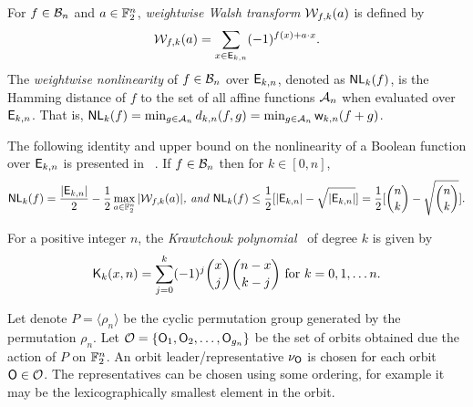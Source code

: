 \documentclass{llncs}
\begin{document}
For $f \in \mathcal{B}_n$ and $a \in \F_2^n$, {\em weightwise Walsh transform} $\mathcal{W}_{f,k}(a)$ is defined by 
\[\mathcal{W}_{f,k}(a) = \sum_{x \in \mathsf{E}_{k,n}} (-1)^{f(x)+ a \cdot x}.\]
The {\em weightwise nonlinearity} of $f \in \mathcal{B}_n$ over $\mathsf{E}_{k,n}$, denoted as $\mathsf{NL}_{k}(f)$, is the Hamming distance of $f$ to the set of all affine functions $\mathcal{A}_n$ when evaluated over $\mathsf{E}_{k,n}$. 
That is, $\mathsf{NL}_{k}(f) = \min_{g \in \mathcal{A}_n} d_{k,n}(f,g) = \min_{g \in \mathcal{A}_n} \mathsf{w}_{k,n}(f+g)$.

The following identity and upper bound on the nonlinearity of a Boolean function over $\mathsf{E}_{k,n}$ is presented in ~\cite{TOSC:CarMeaRot17}.
If $f \in \mathcal{B}_n$ then for $k \in [0,n]$, 
\[\mathsf{NL}_{k}(f) = \frac{|\mathsf{E}_{k,n}|}{2}- \frac{1}{2}\max_{a \in \mathbb{F}_2^n} |\mathcal{W}_{f,k}(a)| \textit{, and }
 \mathsf{NL}_{k}(f) \leq \frac{1}{2} [|\mathsf{E}_{k,n}| - \sqrt{|\mathsf{E}_{k,n}|}] = \frac{1}{2} [{n \choose k} - \sqrt{{n \choose k}}].\]

For a positive integer $n$, the {\em Krawtchouk polynomial}~\cite[Page $151$]{book:MacSlo78} of degree $k$ is given by 
\[\mathsf{K}_{k}(x,n)= \sum_{j=0}^{k} (-1)^j {x \choose j} {n-x \choose k-j} \text{ for } k = 0, 1, \ldots n.\]
\iffalse
Following the results in~\cite{DCC:DalMaiSar06,DAM:GinMea22}, the following relations can be derived.
\begin{theorem}[Krawtchouk Polynomials relations] \label{thm:Kraw}
For integers $n > 0$, $0 \leq k \leq n$ and fixed $a \in \F_2^n$ such that $\w(a) = \ell$, the following relations hold.
\begin{enumerate}
\item $\sum\limits_{x \in \Ekn{k}{n}} (-1)^{a.x} = \kraw{k}{\ell}{n}$.
\item If $l_{a,b}(x)= a \cdot x + b$, where $a \in \F_2^n, b \in \F_2$, be an affine Boolean function then 
\[\wkn{n}{k}(l_{a,b}) = \frac{1}{2} (|\Ekn{k}{n}| - (-1)^b \kraw{k}{\ell}{n}).\]
\end{enumerate}
\end{theorem}


A Boolean function $f$ is {\em rotation symmetric} (RotS) if and only if for any $(x_1,x_2,\ldots,x_n)\in \F_2^n$,
$f(\rho_n^k(x_1,x_2,\ldots,x_n))= f(x_1,x_2,\ldots,x_n)$ for every $1 \leq k \leq n$ where $\rho_n(x_1,x_2,\ldots,x_n) = (x_n,x_1,\ldots,x_{n-1})$ and $\rho_n^k = \rho_n \circ \rho_n^{k-1}$ for $k > 1$.
Therefore, RotS Boolean functions have the same truth value for all vectors in every orbit obtained by the action of permutation group $\langle \rho_n \rangle$ on $\F_2^n$. 
\fi
Let denote $P = \langle \rho_n \rangle$ be the cyclic permutation group generated by the permutation $\rho_n$.
Let $\mathcal{O} = \{\mathsf{O}_1, \mathsf{O}_2,\ldots, \mathsf{O}_{g_n}\}$ be the set of orbits obtained due the action of $P$ on $\F_2^n$. An orbit leader/representative $\nu_{\mathsf{O}}$ is chosen for each orbit $\mathsf{O} \in \mathcal{O}$. The representatives can be chosen using some ordering, for example it may be the lexicographically smallest element in the orbit.
\end{document}
